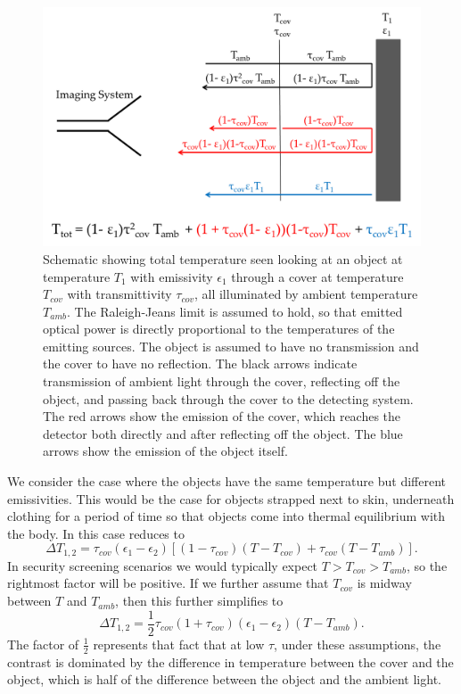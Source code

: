 \begin{figure}
\centering
\includegraphics[width=6in]{images/ch1-t-tot.png}
\caption[Apparent temperature of a covered illuminated object]{
  Schematic showing total temperature seen looking at an object at temperature $T_1$ with emissivity $\epsilon_1$ through a cover at temperature $T_{cov}$ with transmittivity $\tau_{cov}$, all illuminated by ambient temperature $T_{amb}$.
  The Raleigh-Jeans limit is assumed to hold, so that emitted optical power is directly proportional to the temperatures of the emitting sources.
  The object is assumed to have no transmission and the cover to have no reflection.
  The black arrows indicate transmission of ambient light through the cover, reflecting off the object, and passing back through the cover to the detecting system.
  The red arrows show the emission of the cover, which reaches the detector both directly and after reflecting off the object.
  The blue arrows show the emission of the object itself.
}
\label{fig:ch1-t-tot}
\end{figure}

We consider the case where the objects have the same temperature but different emissivities.
This would be the case for objects strapped next to skin, underneath clothing for a period of time so that objects come into thermal equilibrium with the body.
In this case  reduces to
\begin{equation}
  \Delta T_{1,2} = \tau_{cov} (\epsilon_1 - \epsilon_2) \left[ (1 - \tau_{cov}) (T - T_{cov}) + \tau_{cov} (T - T_{amb}) \right].
\end{equation}
In security screening scenarios we would typically expect $T > T_{cov} > T_{amb}$, so the rightmost factor will be positive.
If we further assume that $T_{cov}$ is midway between $T$ and $T_{amb}$, then this further simplifies to
\begin{equation} \label{eqn:ch1-delta-t-simple}
  \Delta T_{1,2} = \frac{1}{2}\tau_{cov}(1+\tau_{cov}) (\epsilon_1 - \epsilon_2) (T - T_{amb}).
\end{equation}
The factor of $\frac{1}{2}$ represents that fact that at low $\tau$, under these assumptions, the contrast is dominated by the difference in temperature between the cover and the object, which is half of the difference between the object and the ambient light.

